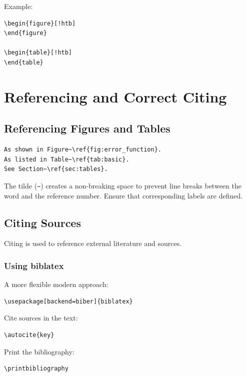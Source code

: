 Example:
\begin{verbatim}
\begin{figure}[!htb]
\end{figure}

\begin{table}[!htb]
\end{table}
\end{verbatim}
\section{Referencing and Correct Citing}

\subsection{Referencing Figures and Tables}

\begin{verbatim}
As shown in Figure~\ref{fig:error_function}.
As listed in Table~\ref{tab:basic}.
See Section~\ref{sec:tables}.
\end{verbatim}

The tilde (\texttt{\textasciitilde}) creates a non-breaking space to prevent line breaks between the word and the reference number. Ensure that corresponding labels are defined.

\subsection{Citing Sources}

Citing is used to reference external literature and sources. \autocite{example}

\subsubsection{Using biblatex}

A more flexible modern approach:

\begin{verbatim}
\usepackage[backend=biber]{biblatex}

\end{verbatim}

Cite sources in the text:

\begin{verbatim}
\autocite{key}
\end{verbatim}

Print the bibliography:

\begin{verbatim}
\printbibliography
\end{verbatim}

